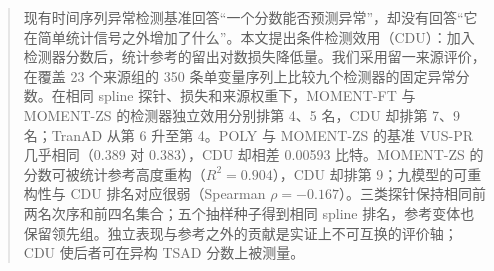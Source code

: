 \begin{abstract}
现有时间序列异常检测基准回答“一个分数能否预测异常”，却没有回答“它在简单统计信号之外增加了什么”。本文提出条件检测效用（CDU）：加入检测器分数后，统计参考的留出对数损失降低量。我们采用留一来源评价，在覆盖 23 个来源组的 350 条单变量序列上比较九个检测器的固定异常分数。在相同 spline 探针、损失和来源权重下，MOMENT-FT 与 MOMENT-ZS 的检测器独立效用分别排第 4、5 名，CDU 却排第 7、9 名；TranAD 从第 6 升至第 4。POLY 与 MOMENT-ZS 的基准 VUS-PR 几乎相同（0.389 对 0.383），CDU 却相差 0.00593 比特。MOMENT-ZS 的分数可被统计参考高度重构（$R^2=0.904$），CDU 却排第 9；九模型的可重构性与 CDU 排名对应很弱（Spearman $\rho=-0.167$）。三类探针保持相同前两名次序和前四名集合；五个抽样种子得到相同 spline 排名，参考变体也保留领先组。独立表现与参考之外的贡献是实证上不可互换的评价轴；CDU 使后者可在异构 TSAD 分数上被测量。
\end{abstract}
